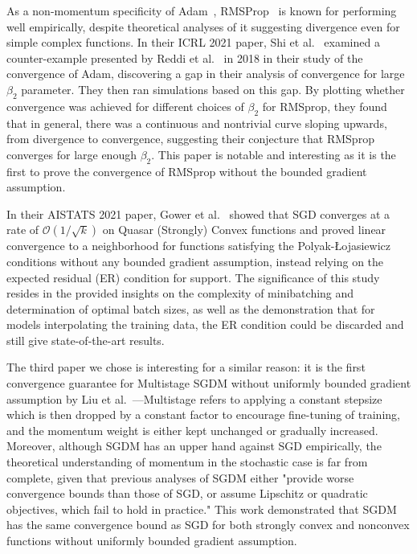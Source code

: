 \documentclass{article}
\begin{document}
As a non-momentum specificity of Adam~\cite{https://doi.org/10.48550/arxiv.1412.6980}, RMSProp~\cite{tieleman2012lecture} is known for performing well empirically, despite theoretical analyses of it suggesting divergence even for simple complex functions.
In their ICRL 2021 paper, Shi et al.~\cite{shi2021rmsprop} examined a counter-example presented by Reddi et al.~\cite{DBLP:journals/corr/abs-1904-09237} in 2018 in their study of the convergence of Adam,
discovering a gap in their analysis of convergence for large $\beta_2$ parameter. They then ran simulations based on this gap. By plotting whether convergence was achieved for different choices of $\beta_2$ for RMSprop, they found that in general, there was a continuous and nontrivial curve sloping upwards, from divergence to
convergence, suggesting their conjecture that RMSprop converges for large enough $\beta_2$. This paper is notable and interesting as it is the first to prove the convergence of RMSprop
without the bounded gradient assumption.

In their AISTATS 2021 paper, Gower et al.~\cite{https://doi.org/10.48550/arxiv.2006.10311} showed that SGD converges at a rate of $\mathcal{O}(1/\sqrt{k})$
on Quasar (Strongly) Convex functions and proved linear convergence to a neighborhood for functions satisfying the Polyak-Łojasiewicz conditions without any bounded gradient assumption, instead relying on the expected residual (ER) condition for support. The significance of this study
resides in the provided insights on the complexity of minibatching and determination of optimal batch sizes, as well as the demonstration that for models interpolating the training data,
the ER condition could be discarded and still give state-of-the-art results.

\pagebreak %

The third paper we chose is interesting for a similar reason: it is the first convergence guarantee for Multistage SGDM without uniformly bounded gradient assumption by Liu et al.~\cite{NEURIPS2020_d3f5d4de}—Multistage refers to applying a constant stepsize
which is then dropped by a constant factor to encourage fine-tuning of training, and the momentum weight is either kept unchanged or gradually increased. Moreover, 
although SGDM has an upper hand against SGD empirically, the theoretical understanding of momentum in the stochastic case is far from complete, given that previous analyses of SGDM
either "provide worse convergence bounds than those of SGD, or assume Lipschitz or quadratic objectives, which fail to hold in practice." This work demonstrated that SGDM has the same convergence bound as SGD for both strongly convex and nonconvex functions without uniformly bounded gradient assumption.
\end{document}
